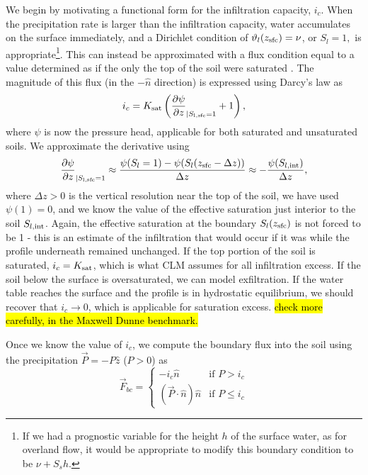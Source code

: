 \documentclass[twoside,10pt]{report}
\begin{document}
We begin by motivating a functional form for the infiltration capacity, $i_c$. When the precipitation rate is larger than the infiltration capacity, water accumulates on the surface immediately, and a Dirichlet condition of $\vartheta_l(z_{\rm sfc}) = \nu$, or $S_l = 1,$ is appropriate\footnote{If we had a prognostic variable for the height $h$ of the surface water, as for overland flow, it would be appropriate to modify this boundary condition to be $\nu+S_s h$.}. This can instead be approximated with a flux condition equal to a value determined as if the only the top of the soil were saturated \citep{Entekhabi89}. The magnitude of this flux (in the $-\hat{n}$ direction) is expressed using Darcy's law as
 \begin{equation}
    i_c = K_{\mathrm{sat}} \left( \frac{\partial \psi}{\partial z}_{|S_{\rm l, sfc}=1} + 1 \right),
\end{equation}
where $\psi$ is now the pressure head, applicable for both saturated and unsaturated soils. We approximate the derivative using
 \begin{equation}\label{eq:approximation_ic}
   \frac{\partial \psi}{\partial z}_{|S_{\rm l, sfc} = 1} \approx \frac{\psi(S_l = 1)-\psi(S_l(z_{\rm sfc}-\Delta z))}{\Delta z} \approx -\frac{\psi(S_{l, \rm int})}{\Delta z},
\end{equation}
where $\Delta z >0$ is the vertical resolution near the top of the soil, we have used $\psi(1) = 0$, and we know the value of the effective saturation just interior to the soil $S_{l, \rm int}$. Again, the effective saturation at the boundary  $S_l(z_{\rm sfc})$ is not forced to be 1 - this is an estimate of the infiltration that would occur if it was while the profile underneath remained unchanged.  If the top portion of the soil is saturated, $i_c = K_{\rm sat}$, which is what CLM assumes for all infiltration excess. If the soil below the surface is oversaturated, we can model exfiltration.  If the water table reaches the surface and the profile is in hydrostatic equilibrium, we should recover that $i_c \rightarrow 0$, which is applicable for saturation excess. \hl{check more carefully, in the Maxwell Dunne benchmark.}

Once we know the value of $i_c$, we compute the boundary flux into the soil using the precipitation $\vec{P} = -P\hat{z}$ ($P>0$) as
\begin{equation}
    \vec{F}_{bc}  = 
        \begin{cases}
        -i_c\hat{n} & \text{if } P > i_c \\
        (\vec{P}\cdot \hat{n}) \hat{n}      & \text{if } P \leq i_c 
    \end{cases}
\end{equation}
\end{document}
